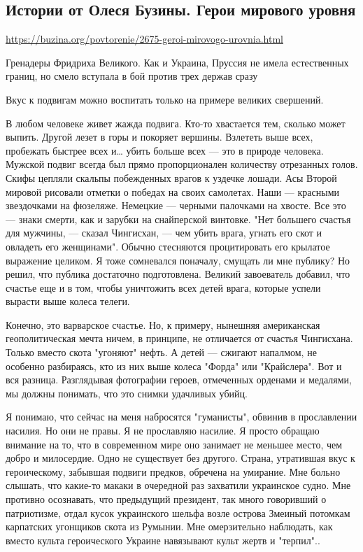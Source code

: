  
 

\subsection{Истории от Олеся Бузины. Герои мирового уровня}

\url{https://buzina.org/povtorenie/2675-geroi-mirovogo-urovnia.html}

Гренадеры Фридриха Великого. Как и Украина, Пруссия не имела естественных
границ, но смело вступала в бой против трех держав сразу

Вкус к подвигам можно воспитать только на примере великих свершений.

В любом человеке живет жажда подвига. Кто-то хвастается тем, сколько может
выпить. Другой лезет в горы и покоряет вершины. Взлететь выше всех, пробежать
быстрее всех и… убить больше всех — это в природе человека. Мужской подвиг
всегда был прямо пропорционален количеству отрезанных голов. Скифы цепляли
скальпы побежденных врагов к уздечке лошади. Асы Второй мировой рисовали
отметки о победах на своих самолетах. Наши — красными звездочками на фюзеляже.
Немецкие — черными палочками на хвосте. Все это — знаки смерти, как и зарубки
на снайперской винтовке. "Нет большего счастья для мужчины, — сказал Чингисхан,
— чем убить врага, угнать его скот и овладеть его женщинами". Обычно стесняются
процитировать его крылатое выражение целиком. Я тоже сомневался поначалу,
смущать ли мне публику? Но решил, что публика достаточно подготовлена. Великий
завоеватель добавил, что счастье еще и в том, чтобы уничтожить всех детей
врага, которые успели вырасти выше колеса телеги.

Конечно, это варварское счастье. Но, к примеру, нынешняя американская
геополитическая мечта ничем, в принципе, не отличается от счастья Чингисхана.
Только вместо скота "угоняют" нефть. А детей — сжигают напалмом, не особенно
разбираясь, кто из них выше колеса "Форда" или "Крайслера". Вот и вся разница.
Разглядывая фотографии героев, отмеченных орденами и медалями, мы должны
понимать, что это снимки удачливых убийц.

Я понимаю, что сейчас на меня набросятся "гуманисты", обвинив в прославлении
насилия. Но они не правы. Я не прославляю насилие. Я просто обращаю внимание на
то, что в современном мире оно занимает не меньшее место, чем добро и
милосердие. Одно не существует без другого. Страна, утратившая вкус к
героическому, забывшая подвиги предков, обречена на умирание. Мне больно
слышать, что какие-то макаки в очередной раз захватили украинское судно. Мне
противно осознавать, что предыдущий президент, так много говоривший о
патриотизме, отдал кусок украинского шельфа возле острова Змеиный потомкам
карпатских угонщиков скота из Румынии. Мне омерзительно наблюдать, как вместо
культа героического Украине навязывают культ жертв и "терпил"..

